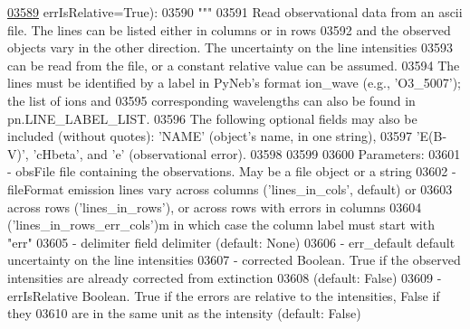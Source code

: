 \begin{DoxyCode}
\hypertarget{classpyneb_1_1core_1_1pynebcore_1_1_observation_l03589}{}\hyperlink{classpyneb_1_1core_1_1pynebcore_1_1_observation_aa33f35ce2f56f5b8a5666601b24a1107}{03589}                  errIsRelative=\textcolor{keyword}{True}):
03590         \textcolor{stringliteral}{"""}
03591 \textcolor{stringliteral}{        Read observational data from an ascii file. The lines can be listed either in columns or in rows}
03592 \textcolor{stringliteral}{        and the observed objects vary in the other direction. The uncertainty on the line intensities}
03593 \textcolor{stringliteral}{        can be read from the file, or a constant relative value can be assumed.}
03594 \textcolor{stringliteral}{        The lines must be identified by a label in PyNeb's format ion\_wave (e.g., 'O3\_5007'); the list of
       ions and}
03595 \textcolor{stringliteral}{        corresponding wavelengths can also be found in pn.LINE\_LABEL\_LIST.}
03596 \textcolor{stringliteral}{        The following optional fields may also be included (without quotes): 'NAME' (object's name, in one
       string), }
03597 \textcolor{stringliteral}{        'E(B-V)', 'cHbeta', and 'e' (observational error).}
03598 \textcolor{stringliteral}{        }
03599 \textcolor{stringliteral}{ }
03600 \textcolor{stringliteral}{        Parameters:}
03601 \textcolor{stringliteral}{            - obsFile        file containing the observations. May be a file object or a string }
03602 \textcolor{stringliteral}{            - fileFormat     emission lines vary across columns ('lines\_in\_cols', default) or }
03603 \textcolor{stringliteral}{                                across rows ('lines\_in\_rows'), or across rows with errors in columns }
03604 \textcolor{stringliteral}{                                ('lines\_in\_rows\_err\_cols')m in which case the column label must start with 
      "err"}
03605 \textcolor{stringliteral}{            - delimiter      field delimiter (default: None)  }
03606 \textcolor{stringliteral}{            - err\_default    default uncertainty on the line intensities}
03607 \textcolor{stringliteral}{            - corrected      Boolean. True if the observed intensities are already corrected from
       extinction}
03608 \textcolor{stringliteral}{                                 (default: False)}
03609 \textcolor{stringliteral}{            - errIsRelative  Boolean. True if the errors are relative to the intensities, False if they}
03610 \textcolor{stringliteral}{                                 are in the same unit as the intensity (default: False)}

\end{DoxyCode}
